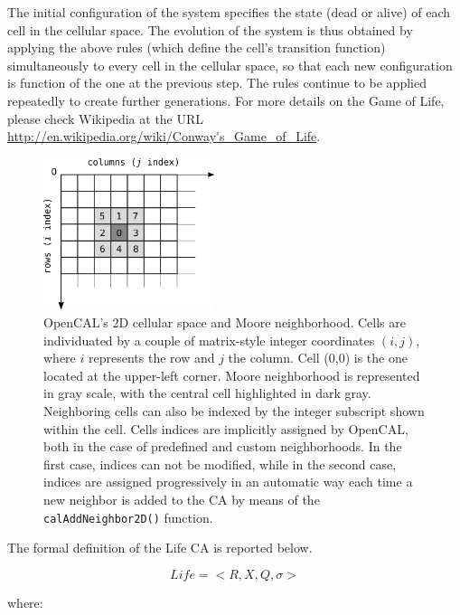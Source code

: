 The initial configuration of the system specifies the state (dead or
alive) of each cell in the cellular space. The evolution of the
system is thus obtained by applying the above rules (which define the
cell's transition function) simultaneously to every cell in the
cellular space, so that each new configuration is function of the one
at the previous step. The rules continue to be applied repeatedly to
create further generations. For more details on the Game of Life,
please check Wikipedia at the URL
\url{http://en.wikipedia.org/wiki/Conway's_Game_of_Life}.

\begin{figure}
  \begin{center}
    \includegraphics[width=5cm]{./images/OpenCAL/LifeNeighborhood.png}
    \caption{OpenCAL's 2D cellular space and Moore neighborhood. Cells
      are individuated by a couple of matrix-style integer coordinates
      $(i, j)$, where $i$ represents the row and $j$ the column. Cell
      (0,0) is the one located at the upper-left corner. Moore
      neighborhood is represented in gray scale, with the central cell
      highlighted in dark gray. Neighboring cells can also be indexed by
      the integer subscript shown within the cell. Cells indices are
      implicitly assigned by OpenCAL, both in the case of predefined
      and custom neighborhoods. In the first case, indices can not be
      modified, while in the second case, indices are assigned
      progressively in an automatic way each time a new neighbor is added
      to the CA by means of the \texttt{calAddNeighbor2D()} function.}
    \label{fig:LifeNeighborhood}
  \end{center}
\end{figure}

The formal definition of the Life CA is reported below.

$$Life = < R, X, Q, \sigma >$$

where:

